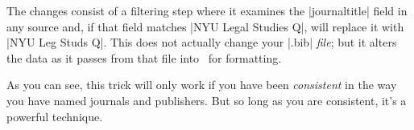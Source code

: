  The changes consist of a filtering step where it examines the
|journaltitle| field in any source and, if that field matches\linebreak 
|NYU Legal Studies Q|,  will replace it with 
|NYU Leg Studs Q|. This does not actually change your 
|.bib| \emph{file}; but it alters the data as it passes from that file into
\biblatex\ for formatting.

As you can see, this trick will only work if you have been
\emph{consistent} in the way you have named journals and
publishers. But so long as you are consistent, it's a powerful
technique.


